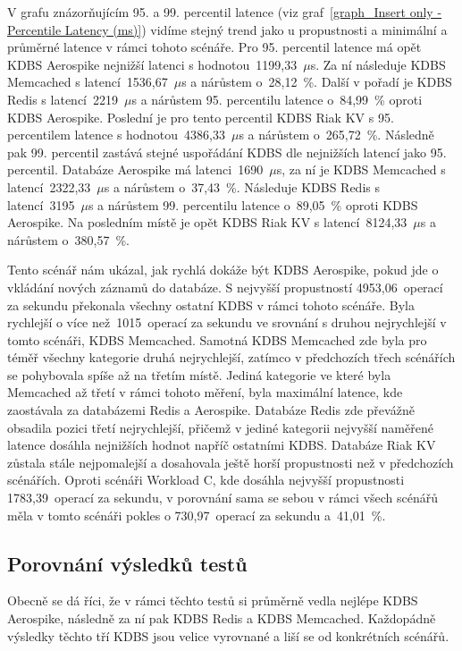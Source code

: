 \documentclass[czech,master,dept460,male,csharp,cpdeclaration]{diploma}
\begin{document}
	V grafu znázorňujícím 95. a 99. percentil latence (viz graf~\ref{graph_Insert only - Percentile Latency (ms)}) vidíme stejný trend jako u propustnosti a minimální a průměrné latence v rámci tohoto scénáře. Pro 95. percentil latence má opět KDBS Aerospike nejnižší latenci s hodnotou~1199,33~$\mu$s. Za ní následuje KDBS Memcached s latencí~1536,67~$\mu$s a nárůstem o~28,12~\%. Další v pořadí je KDBS Redis s latencí~2219~$\mu$s a nárůstem 95. percentilu latence o~84,99~\% oproti KDBS Aerospike. Poslední je pro tento percentil KDBS Riak KV s 95. percentilem latence s hodnotou~4386,33~$\mu$s a nárůstem o~265,72~\%. Následně pak 99. percentil zastává stejné uspořádání KDBS dle nejnižších latencí jako 95. percentil. Databáze Aerospike má latenci~1690~$\mu$s, za ní je KDBS Memcached s latencí~2322,33~$\mu$s a nárůstem o~37,43~\%. Následuje KDBS Redis s latencí~3195~$\mu$s a nárůstem 99. percentilu latence o~89,05~\% oproti KDBS Aerospike. Na posledním místě je opět KDBS Riak KV s latencí~8124,33~$\mu$s a nárůstem o~380,57~\%.
	
	Tento scénář nám ukázal, jak rychlá dokáže být KDBS Aerospike, pokud jde o vkládání nových záznamů do databáze. S nejvyšší propustností 4953,06~operací za sekundu překonala všechny ostatní KDBS v rámci tohoto scénáře. Byla rychlejší o více než~1015~operací za sekundu ve srovnání s druhou nejrychlejší v tomto scénáři, KDBS Memcached. Samotná KDBS Memcached zde byla pro téměř všechny kategorie druhá nejrychlejší, zatímco v předchozích třech scénářích se pohybovala spíše až na třetím místě. Jediná kategorie ve které byla Memcached až třetí v rámci tohoto měření, byla maximální latence, kde zaostávala za databázemi Redis a Aerospike. Databáze Redis zde převážně obsadila pozici třetí nejrychlejší, přičemž v jediné kategorii nejvyšší naměřené latence dosáhla nejnižších hodnot napříč ostatními KDBS. Databáze Riak KV zůstala stále nejpomalejší a dosahovala ještě horší propustnosti než v předchozích scénářích. Oproti scénáři Workload C, kde dosáhla nejvyšší propustnosti 1783,39~operací za sekundu, v porovnání sama se sebou v rámci všech scénářů měla v tomto scénáři pokles o 730,97~operací za sekundu a~41,01~\%.
	
	\subsection{Porovnání výsledků testů}
	
	Obecně se dá říci, že v rámci těchto testů si průměrně vedla nejlépe KDBS Aerospike, následně za ní pak KDBS Redis a KDBS Memcached. Každopádně výsledky těchto tří KDBS jsou velice vyrovnané a liší se od konkrétních scénářů.
	
\end{document}
